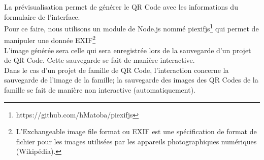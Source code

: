 \par
La prévisualisation permet de générer le QR Code avec les informations du formulaire de l'interface.\\
Pour ce faire, nous utilisons un module de Node.js nommé piexifjs\footnote{https://github.com/hMatoba/piexifjs} qui permet de manipuler une donnée EXIF\footnote{L’Exchangeable image file format ou EXIF est une spécification de format de fichier pour les images utilisées par les appareils photographiques numériques (Wikipédia).}\\
L'image générée sera celle qui sera enregistrée lors de la sauvegarde d'un projet de QR Code. Cette sauvegarde se fait de manière interactive.\\
Dans le cas d'un projet de famille de QR Code, l'interaction concerne la sauvegarde de l'image de la famille; la sauvegarde des images des QR Codes de la famille se fait de manière non interactive (automatiquement).
